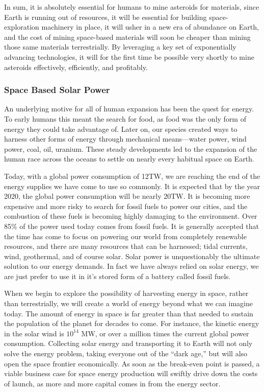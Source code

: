 \documentclass[letter,11pt]{article}
\begin{document}
In sum, it is absolutely essential for humans to mine asteroids for
materials, since Earth is running out of resources, it will be essential
for building space-exploration machinery in place, it will usher in
a new era of abundance on Earth, and the cost of mining space-based
materials will soon be cheaper than mining those same materials terrestrially.
By leveraging a key set of exponentially advancing technologies, it
will for the first time be possible very shortly to mine asteroids
effectively, efficiently, and profitably.

\subsubsection*{Space Based Solar Power}

An underlying motive for all of human expansion has been the quest for energy.
To early humans this meant the search for food, as food was the only form of
energy they could take advantage of. Later on, our species created ways to
harness other forms of energy through mechanical means---water power, wind
power, coal, oil, uranium. These steady developments led to the expansion of
the human race across the oceans to settle on nearly every habitual space on
Earth.

Today, with a global power consumption of 12TW\cite{Seboldt2004}, we are
reaching the end of the energy supplies we have come to use so commonly. It is
expected that by the year 2020, the global power consumption will be nearly
20TW. It is becoming more expensive and more risky to search for fossil fuels
to power our cities, and the combustion of these fuels is becoming highly
damaging to the environment. Over 85\% of the power used today comes from
fossil fuels\cite{Seboldt2004}. It is generally accepted that the time has come
to focus on powering our world from completely renewable resources, and there
are many resources that can be harnessed; tidal currents, wind, geothermal, and
of course solar. Solar power is unquestionably the ultimate solution to our
energy demands. In fact we have always relied on solar energy, we are just
prefer to use it in it's stored form of a battery called fossil fuels.

When we begin to explore the possibility of harvesting energy in space, rather
than terrestrially, we will create a world of energy beyond what we can imagine
today. The amount of energy in space is far greater than that needed to sustain
the population of the planet for decades to come. For instance, the kinetic
energy in the solar wind is $10^{14}$ MW, or over a million times the current
global power consumption. Collecting solar energy and transporting it to Earth
will not only solve the energy problem, taking everyone out of the ``dark age,''
but will also open the space frontier economically. As soon as the break-even
point is passed, a viable business case for space energy production will
swiftly drive down the costs of launch, as more and more capital comes in from
the energy sector.
\end{document}
